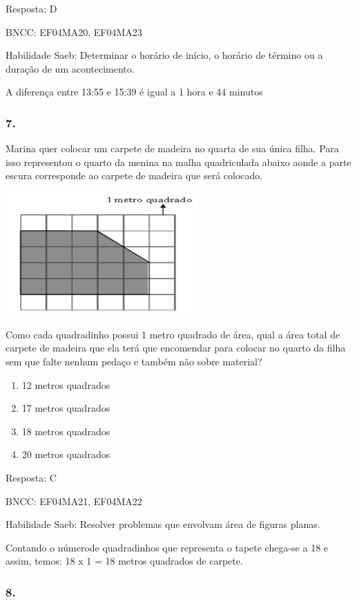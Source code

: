 Resposta: D

BNCC: EF04MA20, EF04MA23

Habilidade Saeb: Determinar o horário de início, o horário de término ou
a duração de um acontecimento.

A diferença entre 13:55 e 15:39 é igual a 1 hora e 44 minutos

\subsubsection{7. }\label{section-178}

Marina quer colocar um carpete de madeira no quarta de sua única filha.
Para isso representou o quarto da menina na malha quadriculada abaixo
aonde a parte escura corresponde ao carpete de madeira que será
colocado.

\includegraphics[width=2.90385in,height=1.84662in]{media/image160.png}

Como cada quadradinho possui 1 metro quadrado de área, qual a área total
de carpete de madeira que ela terá que encomendar para colocar no quarto
da filha sem que falte nenhum pedaço e também não sobre material?

\begin{enumerate}
\def\labelenumi{\alph{enumi})}
\item
  12 metros quadrados
\item
  17 metros quadrados
\item
  18 metros quadrados
\item
  20 metros quadrados
\end{enumerate}

Resposta: C

BNCC: EF04MA21, EF04MA22

Habilidade Saeb: Resolver problemas que envolvam área de figuras planas.

Contando o númerode quadradinhos que representa o tapete chega-se a 18 e
assim, temos: 18 x 1 = 18 metros quadrados de carpete.

\subsubsection{8. }\label{section-179}

